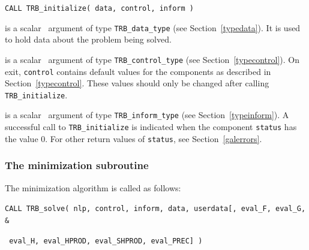 \documentclass{galahad}
\newcommand{\packagename}{TRB}
\begin{document}
\hspace{8mm}
{\tt CALL \packagename\_initialize( data, control, inform )}

\vspace*{-2mm}
\begin{description}

 is a scalar \intentinout\ argument of type
{\tt \packagename\_data\_type}
(see Section~\ref{typedata}). It is used to hold data about the problem being
solved.

 is a scalar \intentout\ argument of type
{\tt \packagename\_control\_type}
(see Section~\ref{typecontrol}).
On exit, {\tt control} contains default values for the components as
described in Section~\ref{typecontrol}.
These values should only be changed after calling
{\tt \packagename\_initialize}.

 is a scalar \intentout\ argument of type
{\tt \packagename\_inform\_type}
(see Section~\ref{typeinform}). A successful call to
{\tt \packagename\_initialize}
is indicated when the  component {\tt status} has the value 0.
For other return values of {\tt status}, see Section~\ref{galerrors}.

\end{description}


\subsubsection{The minimization subroutine}
The minimization algorithm is called as follows:
\vspace*{1mm}

\hspace{8mm}
{\tt CALL \packagename\_solve( nlp, control, inform, data, userdata[, eval\_F,
eval\_G, \hspace{8mm}                  \&}
\vspace*{-1mm}

\hspace{37mm}
{\tt
eval\_H,  eval\_HPROD, eval\_SHPROD, eval\_PREC] )}
\end{document}
